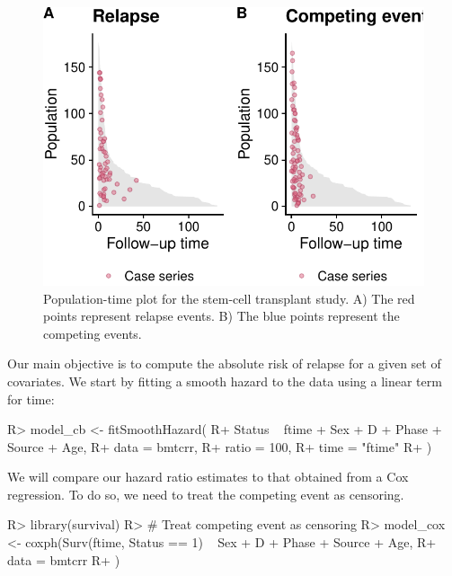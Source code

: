 \documentclass[
]{jss}
\begin{document}
\begin{CodeChunk}
\begin{figure}

{\centering \includegraphics{../figures/compPop-1} 

}

\caption[Population-time plot for the stem-cell transplant study]{Population-time plot for the stem-cell transplant study. A) The red points represent relapse events. B) The blue points represent the competing events.}\label{fig:compPop}
\end{figure}
\end{CodeChunk}

Our main objective is to compute the absolute risk of relapse for a
given set of covariates. We start by fitting a smooth hazard to the data
using a linear term for time:

\begin{CodeChunk}

\begin{CodeInput}
R> model_cb <- fitSmoothHazard(
R+   Status ~ ftime + Sex + D + Phase + Source + Age,
R+   data = bmtcrr,
R+   ratio = 100,
R+   time = "ftime"
R+ )
\end{CodeInput}
\end{CodeChunk}

We will compare our hazard ratio estimates to that obtained from a Cox
regression. To do so, we need to treat the competing event as censoring.

\begin{CodeChunk}

\begin{CodeInput}
R> library(survival)
R> # Treat competing event as censoring
R> model_cox <- coxph(Surv(ftime, Status == 1) ~ Sex + D + Phase + Source + Age,
R+   data = bmtcrr
R+ )
\end{CodeInput}
\end{CodeChunk}
\end{document}
